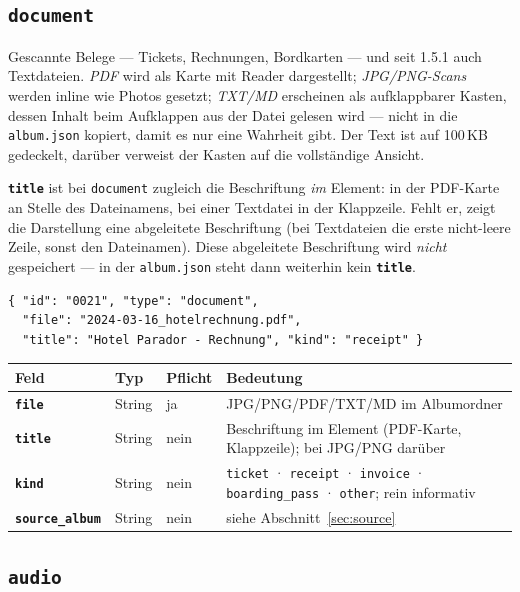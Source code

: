 \documentclass[11pt,a4paper]{article}
\let\mpdtt\texttt
\renewcommand{\texttt}[1]{\mpdtt{\textcolor{mpdred}{#1}}}
\newcommand{\feld}[1]{\mpdtt{\textbf{\textcolor{mpdred}{#1}}}}
\newcommand{\kopf}[1]{\textbf{#1}}
\begin{document}
\subsection{\texttt{document}}

Gescannte Belege — Tickets, Rechnungen, Bordkarten — und seit 1.5.1 auch
Textdateien. \emph{PDF} wird als Karte mit Reader dargestellt;
\emph{JPG/PNG-Scans} werden inline wie Photos gesetzt; \emph{TXT/MD}
erscheinen als aufklappbarer Kasten, dessen Inhalt beim Aufklappen aus der
Datei gelesen wird — nicht in die \texttt{album.json} kopiert, damit es nur
eine Wahrheit gibt. Der Text ist auf 100\,KB gedeckelt, darüber verweist
der Kasten auf die vollständige Ansicht.

\feld{title} ist bei \texttt{document} zugleich die Beschriftung
\emph{im} Element: in der PDF-Karte an Stelle des Dateinamens, bei einer
Textdatei in der Klappzeile. Fehlt er, zeigt die Darstellung eine
abgeleitete Beschriftung (bei Textdateien die erste nicht-leere Zeile,
sonst den Dateinamen). Diese abgeleitete Beschriftung wird \emph{nicht}
gespeichert — in der \texttt{album.json} steht dann weiterhin kein
\feld{title}.

\begin{lstlisting}
{ "id": "0021", "type": "document",
  "file": "2024-03-16_hotelrechnung.pdf",
  "title": "Hotel Parador - Rechnung", "kind": "receipt" }
\end{lstlisting}

\begin{tabularx}{\linewidth}{|l|l|l|L|}
\hline
{}\kopf{Feld} & \kopf{Typ} & \kopf{Pflicht} & \kopf{Bedeutung} \\
\hline
\feld{file} & String & ja & JPG/PNG/PDF/TXT/MD im Albumordner \\
\feld{title} & String & nein & Beschriftung im Element (PDF-Karte, Klappzeile); bei JPG/PNG darüber \\
\feld{kind} & String & nein & \texttt{ticket} · \texttt{receipt} · \texttt{invoice} · \texttt{boarding\_pass} · \texttt{other}; rein informativ \\
\feld{source\_album} & String & nein & siehe Abschnitt~\ref{sec:source} \\
\hline
\end{tabularx}

\subsection{\texttt{audio}}
\end{document}
